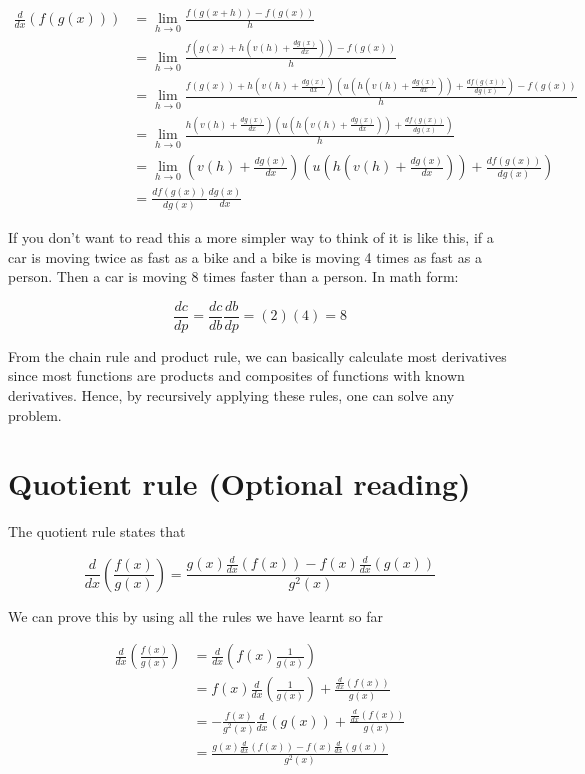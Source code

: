 \documentclass[a4paper,12pt,oneside]{book}
\begin{document}
$$\begin{aligned}
\frac{d}{dx}(f(g(x)))&=\lim_{h\to 0}\frac{f(g(x+h))-f(g(x))}{h}\\
&=\lim_{h\to 0}\frac{f(g(x)+h\left(v(h)+\frac{dg(x)}{dx}\right))-f(g(x))}{h}\\
&=\lim_{h\to 0}\frac{f(g(x))+h\left(v(h)+\frac{dg(x)}{dx}\right)\left(u(h\left(v(h)+\frac{dg(x)}{dx}\right))+\frac{df(g(x))}{dg(x)}\right)-f(g(x))}{h}\\
&=\lim_{h\to 0}\frac{h\left(v(h)+\frac{dg(x)}{dx}\right)\left(u(h\left(v(h)+\frac{dg(x)}{dx}\right))+\frac{df(g(x))}{dg(x)}\right)}{h}\\
&=\lim_{h\to 0}\left(v(h)+\frac{dg(x)}{dx}\right)\left(u(h\left(v(h)+\frac{dg(x)}{dx}\right))+\frac{df(g(x))}{dg(x)}\right)\\
&=\frac{df(g(x))}{dg(x)}\frac{dg(x)}{dx}
\end{aligned}$$

\noindent If you don't want to read this a more simpler way to think of it is like this, if a car is moving twice as fast as a bike and a bike is moving 4 times as fast as a person. Then a car is moving 8 times faster than a person. In math form:

$$\frac{dc}{dp}=\frac{dc}{db}\frac{db}{dp}=(2)(4)=8$$

\noindent From the chain rule and product rule, we can basically calculate most derivatives since most functions are products and composites of functions with known derivatives. Hence, by recursively applying these rules, one can solve any problem.

\section{Quotient rule (Optional reading)}

The quotient rule states that

$$\frac{d}{dx}\left(\frac{f(x)}{g(x)}\right) = \frac{g(x)\frac{d}{dx}(f(x))-f(x)\frac{d}{dx}(g(x))}{g^2(x)}$$

\noindent We can prove this by using all the rules we have learnt so far

$$\begin{aligned}
\frac{d}{dx}\left(\frac{f(x)}{g(x)}\right)&=\frac{d}{dx}\left(f(x)\frac{1}{g(x)}\right)\\
&=f(x)\frac{d}{dx}\left(\frac{1}{g(x)}\right)+\frac{\frac{d}{dx}(f(x))}{g(x)}\\
&=-\frac{f(x)}{g^2(x)}\frac{d}{dx}(g(x))+\frac{\frac{d}{dx}(f(x))}{g(x)}\\
&=\frac{g(x)\frac{d}{dx}(f(x))-f(x)\frac{d}{dx}(g(x))}{g^2(x)}
\end{aligned}$$
\end{document}
